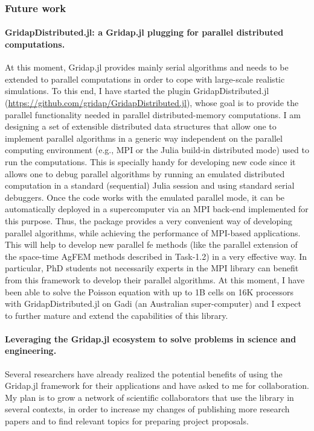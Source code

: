 \documentclass{article}
\begin{document}
\subsubsection*{Future work}
 
 
\paragraph*{GridapDistributed.jl: a  Gridap.jl plugging for parallel distributed computations.} 

At this moment, Gridap.jl provides mainly serial algorithms and needs to be extended to parallel computations in order to cope with large-scale realistic simulations. To this end, I have started the plugin GridapDistributed.jl (\url{https://github.com/gridap/GridapDistributed.jl}), whose goal is to provide the parallel functionality needed in parallel distributed-memory computations. I am designing a set of extensible distributed data structures that allow one to implement parallel algorithms in a generic way independent on the parallel computing environment (e.g., MPI or the Julia build-in distributed mode) used to run the computations. This is specially handy for developing new code since it allows one to debug parallel algorithms by running an emulated distributed computation in a standard (sequential) Julia session and using standard serial debuggers.  Once the code works with the emulated parallel mode, it can be automatically deployed in a supercomputer via an MPI back-end implemented for this purpose. Thus, the package provides a very convenient way of developing parallel algorithms, while achieving the performance of MPI-based applications. This will help to develop new parallel \ac{fe} methods (like the parallel extension of the space-time AgFEM methods described in Task-1.2) in a very effective way. In particular, PhD students not necessarily experts in the MPI library can benefit from this framework to develop their parallel algorithms. At this moment, I have been able to solve the Poisson equation with up to 1B cells on 16K processors with GridapDistributed.jl on Gadi (an Australian super-computer) and I expect to further mature and extend the capabilities of this library.  
 
\paragraph*{Leveraging the Gridap.jl ecosystem to solve problems in science and engineering.}

Several researchers have already realized the potential benefits of using the Gridap.jl framework for their applications and have asked to me for collaboration. My plan is to grow a network of scientific collaborators that use the library in several contexts, in order to increase my changes of publishing more research papers and to find relevant topics for preparing project proposals.
\end{document}

